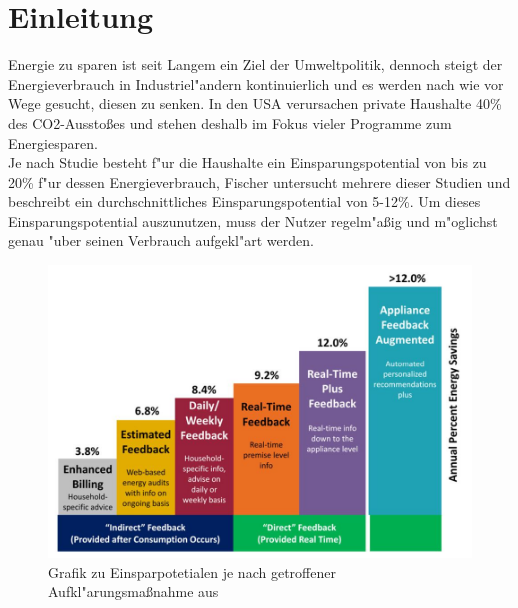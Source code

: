 \section{Einleitung}
\label{Einleitung}

	Energie zu sparen ist seit Langem ein Ziel der Umweltpolitik, dennoch steigt der Energieverbrauch in Industriel"andern kontinuierlich und es werden nach wie vor Wege gesucht, diesen zu senken. 
	In den USA verursachen private Haushalte 40\% des CO2-Aussto{\ss}es \cite{vandenbergh2008individual} und stehen deshalb im Fokus vieler Programme zum Energiesparen. \\
	Je nach Studie besteht f"ur die Haushalte ein Einsparungspotential von bis zu 20\% \cite{armel2013disaggregation} f"ur dessen Energieverbrauch, Fischer \cite{fischer2008feedback} untersucht mehrere dieser Studien und beschreibt ein durchschnittliches Einsparungspotential von 5-12\%. 
	Um dieses Einsparungspotential auszunutzen, muss der Nutzer regelm"a{\ss}ig und m"oglichst genau "uber seinen Verbrauch aufgekl"art werden. 	%
	\begin{figure}[ht]
\includegraphics[width=\textwidth]{1_Grafiken/fig1armel.jpg}
	\caption[Einsparungpotentiale nach Ma{\ss}nahme]{Grafik zu Einsparpotetialen je nach getroffener Aufkl"arungsma{\ss}nahme aus \cite{armel2013disaggregation}}
\label{potentiale}
\end{figure}

